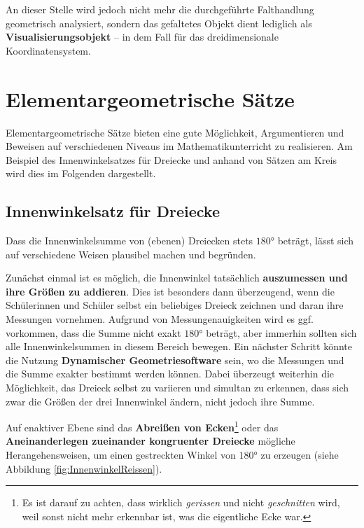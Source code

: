 \documentclass[
]{scrbook}
\theoremstyle{definition}
\theoremstyle{definition}
\theoremstyle{definition}
\theoremstyle{definition}
\theoremstyle{remark}
\begin{document}
An dieser Stelle wird jedoch nicht mehr die durchgeführte Falthandlung geometrisch analysiert, sondern das gefaltetes Objekt dient lediglich als \textbf{Visualisierungsobjekt} -- in dem Fall für das dreidimensionale Koordinatensystem.

\hypertarget{elementargeometrische-suxe4tze}{%
\section{Elementargeometrische Sätze}\label{elementargeometrische-suxe4tze}}

Elementargeometrische Sätze bieten eine gute Möglichkeit, Argumentieren und Beweisen auf verschiedenen Niveaus im Mathematikunterricht zu realisieren. Am Beispiel des Innenwinkelsatzes für Dreiecke und anhand von Sätzen am Kreis wird dies im Folgenden dargestellt.

\hypertarget{innenwinkelsatz-fuxfcr-dreiecke}{%
\subsection{Innenwinkelsatz für Dreiecke}\label{innenwinkelsatz-fuxfcr-dreiecke}}

Dass die Innenwinkelsumme von (ebenen) Dreiecken stets \(180°\) beträgt, lässt sich auf verschiedene Weisen plausibel machen und begründen.

Zunächst einmal ist es möglich, die Innenwinkel tatsächlich \textbf{auszumessen und ihre Größen zu addieren}. Dies ist besonders dann überzeugend, wenn die Schülerinnen und Schüler selbst ein beliebiges Dreieck zeichnen und daran ihre Messungen vornehmen. Aufgrund von Messungenauigkeiten wird es ggf. vorkommen, dass die Summe nicht exakt \(180°\) beträgt, aber immerhin sollten sich alle Innenwinkelsummen in diesem Bereich bewegen. Ein nächster Schritt könnte die Nutzung \textbf{Dynamischer Geometriesoftware} sein, wo die Messungen und die Summe exakter bestimmt werden können. Dabei überzeugt weiterhin die Möglichkeit, das Dreieck selbst zu variieren und simultan zu erkennen, dass sich zwar die Größen der drei Innenwinkel ändern, nicht jedoch ihre Summe.

Auf enaktiver Ebene sind das \textbf{Abreißen von Ecken}\footnote{Es ist darauf zu achten, dass wirklich \emph{gerissen} und nicht \emph{geschnitten} wird, weil sonst nicht mehr erkennbar ist, was die eigentliche Ecke war.} oder das \textbf{Aneinanderlegen zueinander kongruenter Dreiecke} mögliche Herangehensweisen, um einen gestreckten Winkel von \(180°\) zu erzeugen (siehe Abbildung \ref{fig:InnenwinkelReissen}).
\end{document}
